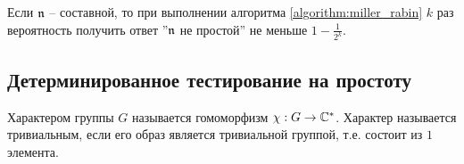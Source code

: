 \documentclass[_00_dissertation.tex]{subfiles}
\begin{document}
\begin{remark}
    Если $\mathfrak{n}$ -- составной, то при выполнении алгоритма \ref{algorithm:miller_rabin} $k$ раз вероятность получить ответ ''$\mathfrak{n}$ не простой'' не меньше $1 - \frac{1}{2^k}$.
\end{remark}

\subsection{Детерминированное тестирование на простоту}

\begin{definition}
    Характером группы $G$ называется гомоморфизм $\chi: G \to \mathbb{C}^{*}$.
    Характер называется тривиальным, если его образ является тривиальной группой, т.е. состоит из $1$ элемента.
\end{definition}





\end{document}
